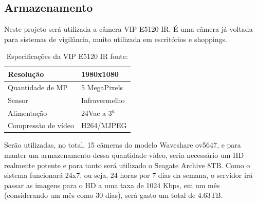 \subsection{Armazenamento}

	Neste projeto será utilizada a câmera VIP E5120 IR. É uma câmera já voltada para sistemas de vigilância, muito utilizada em escritórios e shoppings.

	\begin{table}[H]
		\centering
		\begin{tabular}{|l|l|}
			\hline
			Resolução           & 1980x1080       \\ \hline
			Quantidade de MP    & 5 MegaPixels \\ \hline
			Sensor              & Infravermelho  \\ \hline
			Alimentação         & 24Vac a 3$^a$  \\ \hline
			Compressão de vídeo & H264/MJPEG     \\ \hline
		\end{tabular}
		\caption{Especificações da VIP E5120 IR fonte: \cite{mercadoLivreVIPE5120}}
		\label{my-label}
	\end{table}

	Serão utilizadas, no total, 15 câmeras do modelo  Waveshare ov5647, e para manter um armazenamento dessa quantidade vídeo, seria necessário um HD realmente potente e para tanto será utilizado o Seagate Archive 8TB. Como o sistema funcionará  24x7, ou seja, 24 horas por 7 dias da semana, o servidor irá passar as imagens para o HD a uma taxa de 1024 Kbps, em um mês (considerando um mês como 30 dias), será gasto um total de 4.63TB.

